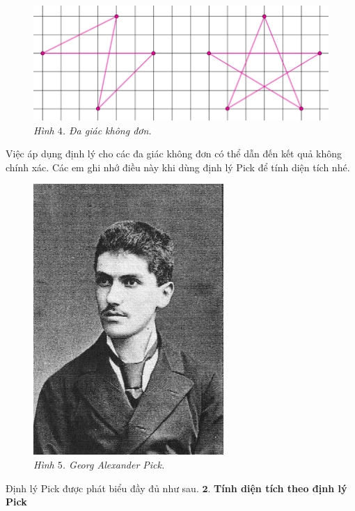 \begin{multicols}{2}
	\begin{figure}[H]
		\vspace*{5pt}
		\centering
		\captionsetup{labelformat= empty, justification=centering}
		\includegraphics[width= 1\linewidth]{4}
		\caption{\small\textit{\color{toancuabi}Hình $4$. Đa giác không đơn.}}
		\vspace*{-10pt}
	\end{figure}
	Việc áp dụng định lý cho các đa giác không đơn có thể dẫn đến kết quả không chính xác. Các em ghi nhớ điều này khi dùng định lý Pick để tính diện tích nhé.
	\begin{figure}[H]
		\vspace*{-5pt}
		\centering
		\captionsetup{labelformat= empty, justification=centering}
		\includegraphics[width= 0.55\linewidth]{5}
		\caption{\small\textit{\color{toancuabi}Hình $5$. Georg Alexander Pick.}}
		\vspace*{-10pt}
	\end{figure}
	Định lý Pick được phát biểu đầy đủ như sau.
	\vskip 0.1cm
	$\pmb{2.}$ \textbf{\color{toancuabi}Tính diện tích theo định lý Pick}

\end{multicols}
